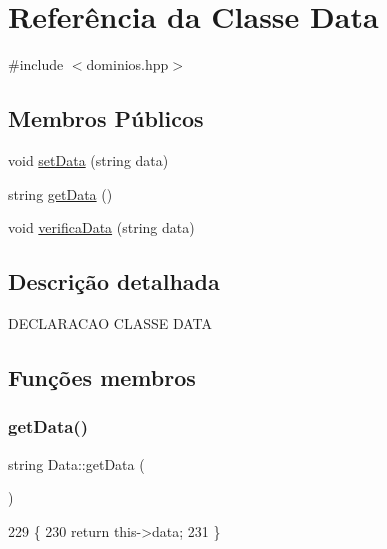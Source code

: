 \hypertarget{class_data}{}\section{Referência da Classe Data}
\label{class_data}


{\ttfamily \#include $<$dominios.\+hpp$>$}

\subsection*{Membros Públicos}
\begin{DoxyCompactItemize}
\item 
void \mbox{\hyperlink{class_data_a5245638838a033c98a8b760836dddb7d}{set\+Data}} (string data)
\item 
string \mbox{\hyperlink{class_data_afc7b15a5e81334858e48709b2f45cdc3}{get\+Data}} ()
\item 
void \mbox{\hyperlink{class_data_aa3c7b5fcca1f82689a7f6445e4d222c8}{verifica\+Data}} (string data)
\end{DoxyCompactItemize}


\subsection{Descrição detalhada}
D\+E\+C\+L\+A\+R\+A\+C\+AO C\+L\+A\+S\+SE D\+A\+TA 

\subsection{Funções membros}
\mbox{\label{class_data_afc7b15a5e81334858e48709b2f45cdc3}} 
\subsubsection{\texorpdfstring{get\+Data()}{getData()}}
{\footnotesize\ttfamily string Data\+::get\+Data (\begin{DoxyParamCaption}{ }\end{DoxyParamCaption})}


\begin{DoxyCode}
229 \{
230   \textcolor{keywordflow}{return} this->data;
231 \}
\end{DoxyCode}
\mbox{\label{class_data_a5245638838a033c98a8b760836dddb7d}} 
